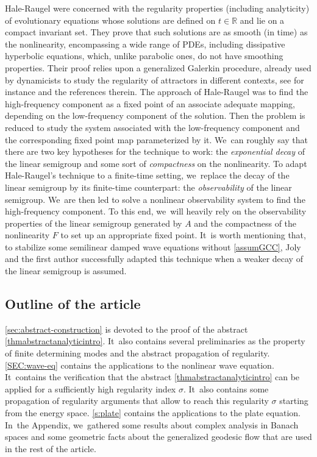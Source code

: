 \documentclass[10pt]{amsart}
\theoremstyle{definition}
\newcommand{\R}{\mathbb{R}}
\begin{document}
Hale-Raugel were concerned with the regularity properties (including analyticity) of evolutionary equations whose solutions are defined on $t\in\R$ and lie on a compact invariant set. They prove that such solutions are as smooth (in time) as the nonlinearity, encompassing a wide range of PDEs, including dissipative hyperbolic equations, which, unlike parabolic ones, do not have smoothing properties. Their proof relies upon a generalized Galerkin procedure, already used by dynamicists to study the regularity of attractors in different contexts, see for instance \cite{FT:89,Go:00-torus,Go:18} and the references therein. The approach of Hale-Raugel was to find the high-frequency component as a fixed point of an associate adequate mapping, depending on the low-frequency component of the solution. Then the problem is reduced to study the system associated with the low-frequency component and the corresponding fixed point map parameterized by it. We~can roughly say that there are two key hypotheses for the technique to work: the \emph{exponential decay} of the linear semigroup and some sort of \emph{compactness} on the nonlinearity. To adapt Hale-Raugel's technique to a finite-time setting, we~replace the decay of the linear semigroup by its finite-time counterpart: the \emph{observability} of the linear semigroup. We~are then led to solve a nonlinear observability system to find the high-frequency component. To this end, we~will heavily rely on the observability properties of the linear semigroup generated by $A$ and the compactness of the nonlinearity $F$ to set up an appropriate fixed point. It~is worth mentioning that, to stabilize some semilinear damped wave equations without \ref{assumGCC}, Joly and the first author \cite{2020:joly-laurent:decay-nlw-no-gcc} successfully adapted this technique when a weaker decay of the linear semigroup is assumed.

\subsection{Outline of the article}\cref{sec:abstract-construction} is devoted to the proof of the abstract \cref{thmabstractanalyticintro}. It~also contains several preliminaries as the property of finite determining modes and the abstract propagation of regularity. \cref{SEC:wave-eq} contains the applications to the nonlinear wave equation. It~contains the verification that the abstract \cref{thmabstractanalyticintro} can be applied for a sufficiently high regularity index $\sigma$. It~also contains some propagation of regularity arguments that allow to reach this regularity $\sigma$ starting from the energy space. \cref{s:plate} contains the applications to the plate equation. In~the Appendix, we~gathered some results about complex analysis in Banach spaces and some geometric facts about the generalized geodesic flow that are used in the rest of the article.
\end{document}
